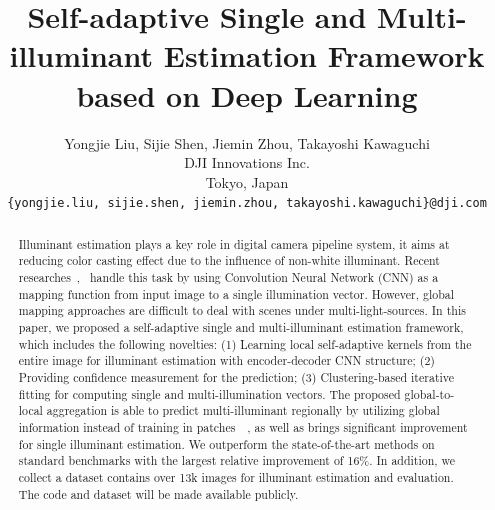 \documentclass[10pt,twocolumn,letterpaper]{article}
\begin{document}
\title{Self-adaptive Single and Multi-illuminant Estimation Framework \\
based on Deep Learning}

\author{Yongjie Liu, Sijie Shen, Jiemin Zhou, Takayoshi Kawaguchi \\
DJI Innovations Inc. \\
Tokyo, Japan \\
{\tt\small \{yongjie.liu, sijie.shen, jiemin.zhou, takayoshi.kawaguchi\}@dji.com}
}


\maketitle

\begin{abstract}
  Illuminant estimation plays a key role in digital camera pipeline system,
  it aims at reducing color casting effect due to the influence of non-white illuminant.
  Recent researches~\cite{shi2016deep},~\cite{hu2017fc} handle this task by
  using Convolution Neural Network (CNN) as a mapping function from input image to a single illumination vector.
  However, global mapping approaches are difficult to deal with scenes under multi-light-sources.
  In this paper, we proposed a self-adaptive single and multi-illuminant estimation framework,
  which includes the following novelties:
  (1) Learning local self-adaptive kernels from the entire image for illuminant estimation with encoder-decoder CNN structure;
  (2) Providing confidence measurement for the prediction;
  (3) Clustering-based iterative fitting for computing single and multi-illumination vectors.
  The proposed global-to-local aggregation is able to predict multi-illuminant regionally by utilizing
  global information instead of training in patches~\cite{bianco2015single}~\cite{gijsenij2012color},
  as well as brings significant improvement for single illuminant estimation.
  We outperform the state-of-the-art methods on standard benchmarks with the largest relative improvement of 16\%.
  In addition, we collect a dataset contains over 13k images for illuminant estimation and evaluation.
  The code and dataset will be made available publicly.
\end{abstract}
\end{document}
